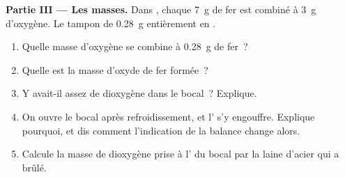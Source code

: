 \begin{problem}
\medskip
\noindent\textbf{Partie III --- Les masses.}
Dans , chaque \qty{7}{g} de fer est combiné à \qty{3}{g}
d'oxygène. Le tampon de \qty{0.28}{g}  entièrement en .
\begin{enumerate}[resume]
  \item Quelle masse d'oxygène se combine à \qty{0.28}{g} de fer~?
  \item Quelle est la masse d'oxyde de fer formée~?
  \item Y avait-il assez de dioxygène dans le bocal~? Explique.
  \item On ouvre le bocal après refroidissement, et l' s'y engouffre.
        Explique pourquoi, et dis comment l'indication de la balance
        change alors.
  \item Calcule la masse de dioxygène prise à l' du bocal par la laine
        d'acier qui a brûlé.
\end{enumerate}
\end{problem}
